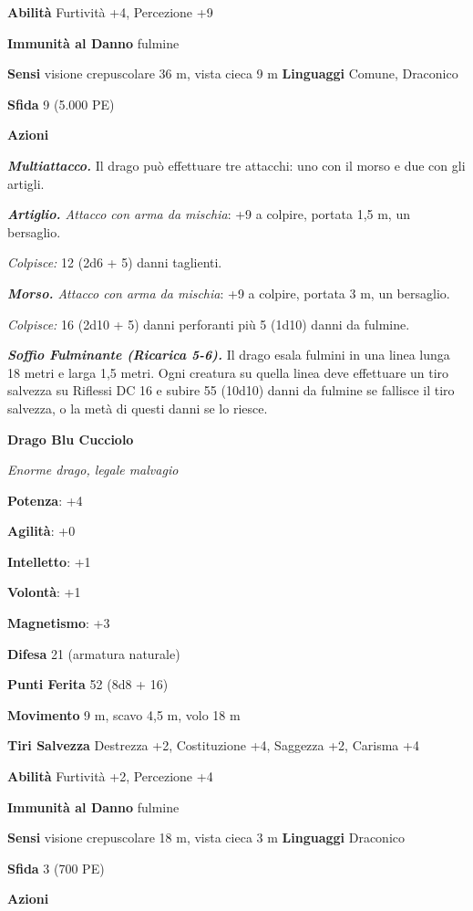 \begin{multicols}{2}
\textbf{Abilità} Furtività +4, Percezione +9

\textbf{Immunità al Danno} fulmine

\textbf{Sensi} visione crepuscolare 36 m, vista cieca 9 m
\textbf{Linguaggi} Comune, Draconico

\textbf{Sfida} 9 (5.000 PE)

\textbf{Azioni}

\emph{\textbf{Multiattacco.}} Il drago può effettuare tre attacchi: uno
con il morso e due con gli artigli.

\emph{\textbf{Artiglio.} Attacco con arma da mischia}: +9 a colpire,
portata 1,5 m, un bersaglio.

\emph{Colpisce:} 12 (2d6 + 5) danni taglienti.

\emph{\textbf{Morso.} Attacco con arma da mischia}: +9 a colpire,
portata 3 m, un bersaglio.

\emph{Colpisce:} 16 (2d10 + 5) danni perforanti più 5 (1d10) danni da
fulmine.

\emph{\textbf{Soffio Fulminante (Ricarica 5-6).}} Il drago esala fulmini
in una linea lunga 18 metri e larga 1,5 metri. Ogni creatura su quella
linea deve effettuare un tiro salvezza su Riflessi DC 16 e subire 55
(10d10) danni da fulmine se fallisce il tiro salvezza, o la metà di
questi danni se lo riesce.

\textbf{Drago Blu Cucciolo}

\emph{Enorme drago, legale malvagio}

\textbf{Potenza}: +4

\textbf{Agilità}: +0

\textbf{Intelletto}: +1

\textbf{Volontà}: +1

\textbf{Magnetismo}: +3

\textbf{Difesa} 21 (armatura naturale)

\textbf{Punti Ferita} 52 (8d8 + 16)

\textbf{Movimento} 9 m, scavo 4,5 m, volo 18 m

\textbf{Tiri Salvezza} Destrezza +2, Costituzione +4, Saggezza +2,
Carisma +4

\textbf{Abilità} Furtività +2, Percezione +4

\textbf{Immunità al Danno} fulmine

\textbf{Sensi} visione crepuscolare 18 m, vista cieca 3 m
\textbf{Linguaggi} Draconico

\textbf{Sfida} 3 (700 PE)

\textbf{Azioni}


\end{multicols}
